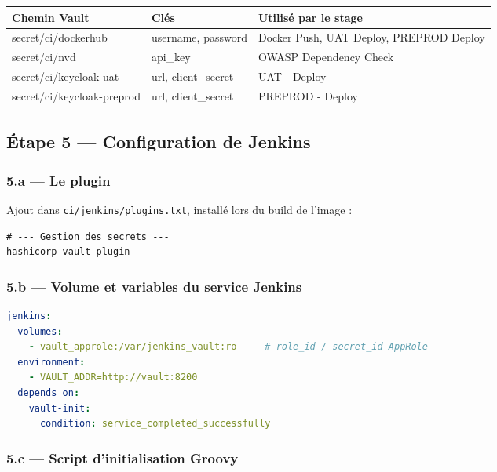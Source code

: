 \documentclass[11pt,a4paper]{article}
\newcommand{\vpath}[1]{\texttt{#1}}
\begin{document}
\begin{center}
\begin{tabularx}{\linewidth}{>{\ttfamily\small}l >{\ttfamily\small}l X}
\toprule
\textrm{\textbf{Chemin Vault}} & \textrm{\textbf{Clés}} & \textbf{Utilisé par le stage} \\
\midrule
secret/ci/dockerhub        & username, password   & Docker Push, UAT Deploy, PREPROD Deploy \\
secret/ci/nvd              & api\_key             & OWASP Dependency Check \\
secret/ci/keycloak-uat     & url, client\_secret  & UAT - Deploy \\
secret/ci/keycloak-preprod & url, client\_secret  & PREPROD - Deploy \\
\bottomrule
\end{tabularx}
\end{center}

\subsection{Étape 5 — Configuration de Jenkins}

\subsubsection*{5.a — Le plugin}

Ajout dans \vpath{ci/jenkins/plugins.txt}, installé lors du build de l'image :

\begin{lstlisting}
# --- Gestion des secrets ---
hashicorp-vault-plugin
\end{lstlisting}

\subsubsection*{5.b — Volume et variables du service Jenkins}

\begin{lstlisting}[language=yaml]
jenkins:
  volumes:
    - vault_approle:/var/jenkins_vault:ro     # role_id / secret_id AppRole
  environment:
    - VAULT_ADDR=http://vault:8200
  depends_on:
    vault-init:
      condition: service_completed_successfully
\end{lstlisting}

\subsubsection*{5.c — Script d'initialisation Groovy}
\end{document}
